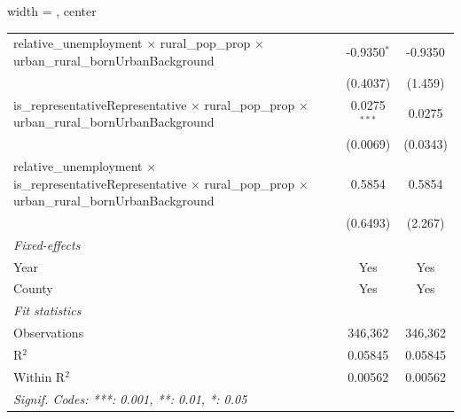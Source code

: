 \begin{adjustbox}{width = \textwidth, center}
\begin{tabular}{lcc}
      relative\_unemployment $\times$ rural\_pop\_prop $\times$ urban\_rural\_bornUrbanBackground                                                    & -0.9350$^{*}$           & -0.9350\\   
                                                                                                                                                     & (0.4037)                & (1.459)\\   
      is\_representativeRepresentative $\times$ rural\_pop\_prop $\times$ urban\_rural\_bornUrbanBackground                                          & 0.0275$^{***}$          & 0.0275\\   
                                                                                                                                                     & (0.0069)                & (0.0343)\\   
      relative\_unemployment $\times$ is\_representativeRepresentative $\times$ rural\_pop\_prop $\times$ urban\_rural\_bornUrbanBackground          & 0.5854                  & 0.5854\\   
                                                                                                                                                     & (0.6493)                & (2.267)\\   
      \midrule
      \emph{Fixed-effects}\\
      Year                                                                                                                                           & Yes                     & Yes\\  
      County                                                                                                                                         & Yes                     & Yes\\  
      \midrule
      \emph{Fit statistics}\\
      Observations                                                                                                                                   & 346,362                 & 346,362\\  
      R$^2$                                                                                                                                          & 0.05845                 & 0.05845\\  
      Within R$^2$                                                                                                                                   & 0.00562                 & 0.00562\\  
      \midrule \midrule
      \multicolumn{3}{l}{\emph{Signif. Codes: ***: 0.001, **: 0.01, *: 0.05}}\\
   \end{tabular}
\end{adjustbox}
\par\endgroup



